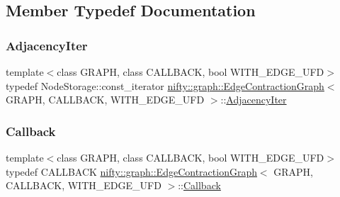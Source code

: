 \subsection{Member Typedef Documentation}
\mbox{\label{classnifty_1_1graph_1_1EdgeContractionGraph_a447212f5ced0c4ef4d304e8b89f4f200}} 
\subsubsection{\texorpdfstring{Adjacency\+Iter}{AdjacencyIter}}
{\footnotesize\ttfamily template$<$class G\+R\+A\+PH, class C\+A\+L\+L\+B\+A\+CK, bool W\+I\+T\+H\+\_\+\+E\+D\+G\+E\+\_\+\+U\+FD$>$ \\
typedef Node\+Storage\+::const\+\_\+iterator \hyperlink{classnifty_1_1graph_1_1EdgeContractionGraph}{nifty\+::graph\+::\+Edge\+Contraction\+Graph}$<$ G\+R\+A\+PH, C\+A\+L\+L\+B\+A\+CK, W\+I\+T\+H\+\_\+\+E\+D\+G\+E\+\_\+\+U\+FD $>$\+::\hyperlink{classnifty_1_1graph_1_1EdgeContractionGraph_a447212f5ced0c4ef4d304e8b89f4f200}{Adjacency\+Iter}}

\mbox{\label{classnifty_1_1graph_1_1EdgeContractionGraph_a75e91e51c78d2f427a31c30dcd8996ed}} 
\subsubsection{\texorpdfstring{Callback}{Callback}}
{\footnotesize\ttfamily template$<$class G\+R\+A\+PH, class C\+A\+L\+L\+B\+A\+CK, bool W\+I\+T\+H\+\_\+\+E\+D\+G\+E\+\_\+\+U\+FD$>$ \\
typedef C\+A\+L\+L\+B\+A\+CK \hyperlink{classnifty_1_1graph_1_1EdgeContractionGraph}{nifty\+::graph\+::\+Edge\+Contraction\+Graph}$<$ G\+R\+A\+PH, C\+A\+L\+L\+B\+A\+CK, W\+I\+T\+H\+\_\+\+E\+D\+G\+E\+\_\+\+U\+FD $>$\+::\hyperlink{classnifty_1_1graph_1_1EdgeContractionGraph_a75e91e51c78d2f427a31c30dcd8996ed}{Callback}}

